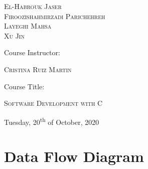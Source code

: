 \begin{titlepage}
	{\scshape\Large El-Habrouk Jaser \\ Firoozishahmirzadi Parichehreh \\ Layeghi Mahsa \\ Xu Jin} 
	
	\vspace{3\baselineskip} 
	
	
		
	Course Instructor:
	
	\vspace{0.5\baselineskip} %
	
	{\scshape\Large Cristina Ruiz Martin}
	
	\vspace{3\baselineskip} %
	
	Course Title:
	\vspace{0.5\baselineskip} %
	
	{\scshape\Large Software Development with C} 
	
	\vfill %
	
	
	
	\vspace{0.3\baselineskip} %
	
	Tuesday, 20\textsuperscript{th} of October, 2020 %
	

\end{titlepage}




\section{Data Flow Diagram}

